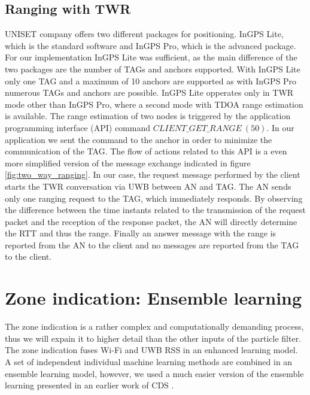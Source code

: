 \subsection{Ranging with TWR}
UNISET company offers two different packages for positioning. InGPS Lite, which is the standard software and InGPS Pro, which is the advanced package. For our implementation InGPS Lite was sufficient, as the main difference of the two packages are the number of TAGs and anchors supported. With InGPS Lite only one TAG and a maximum of 10 anchors are supported as with InGPS Pro numerous TAGs and anchors are possible. InGPS Lite opperates only in TWR mode other than InGPS Pro, where a second mode with TDOA range estimation is available.
The range estimation of two nodes is triggered by the application programming interface (API) command $CLIENT\_GET\_RANGE\ (50)$. In our application we sent the command to the anchor in order to minimize the communication of the TAG. The flow of actions related to this API is a even more simplified version of the message exchange indicated in figure \ref{fig:two_way_ranging}. In our case, the request message performed by the client starts the TWR conversation via UWB between AN and TAG. The AN sends only one ranging request to the TAG, which immediately responds. By observing the difference between the time instants related to the transmission of the request packet and the reception of the response packet, the AN will directly determine the RTT and thus the range. Finally an answer message with the range is reported from the AN to the client and no messages are reported from the TAG to the client.



\section{Zone indication: Ensemble learning}
The zone indication is a rather complex and computationally demanding process, thus we will expain it to higher detail than the other inputs of the particle filter. The zone indication fuses Wi-Fi and  UWB RSS in an enhanced learning model. A set of independent individual machine learning methods are combined in an ensemble learning model, however, we used a much easier version of the ensemble learning presented in an earlier work of CDS \cite{Carrera2}.

